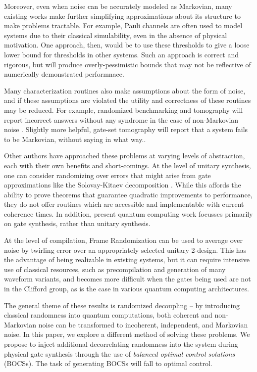 \documentclass[aps,nofootinbib,pra,notitlepage,twocolumn]{revtex4-1}
\begin{document}
Moreover, even when noise can be accurately modeled as Markovian, many existing works make further simplifying approximations about its structure to make problems tractable. For example, Pauli channels are often used to model systems due to their classical simulability\cite{quant-ph/9807006}, even in the absence of physical motivation\cite{Aliferis2007, Knill2005, Wang2011, DuclosCianci2010, Wootton2012, Bombin2012, Puzzuoli2014, aliferis2008accuracy}. One approach, then, would be to use these thresholds to give a loose lower bound for thresholds in other systems\cite{Puzzuoli2014}. Such an approach is correct and rigorous, but will produce overly-pessimistic bounds that may not be reflective of numerically demonstrated performnace.

Many characterization routines also make assumptions about the form of noise, and if these assumptions are violated the utility and correctness of these routines may be reduced. For example, randomized benchmarking and tomography will report incorrect answers without any syndrome in the case of non-Markovian noise \cite{Merkel2013}. Slightly more helpful, gate-set tomography will report that a system fails to be Markovian, without saying in what way..

Other authors have approached these problems at varying levels of abstraction, each with their own benefits and short-comings. At the level of unitary synthesis, one can consider randomizing over errors that might arise from gate approximations like the Solovay-Kitaev decomposition \cite{Campbell2017, 1612.01011}. While this affords the ability to prove theorems that guarantee quadratic improvements to performance, they do not offer routines which are accessible and implementable with current coherence times. In addition, present quantum computing work focusses primarily on gate synthesis, rather than unitary synthesis.

At the level of compilation, Frame Randomization\cite{Wallman2016, Ware2018} can be used to average over noise by twirling error over an appropriately selected unitary 2-design.\cite{roy2009unitary} This has the advantage of being realizable in existing systems\cite{Ware2018}, but it can require intensive use of classical resources, such as precompilation and generation of many waveform variants, and becomes more difficult when the gates being used are not in the Clifford group, as is the case in various quantum computing architectures.

The general theme of these results is randomized decoupling\cite{Viola2005, Viola} -- by introducing classical randomness into quantum computations, both coherent and non-Markovian noise can be transformed to incoherent, independent, and Markovian noise. In this paper, we explore a different method of solving these problems. We propose to inject additional decorrelating randomness into the system during physical gate synthesis through the use of \emph{balanced optimal control solutions} (BOCSs). The task of generating BOCSs will fall to optimal control.
\end{document}
